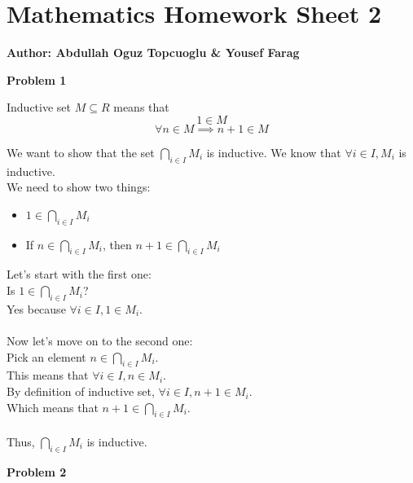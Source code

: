 \documentclass{article}
\begin{document}
\section*{\huge Mathematics Homework Sheet 2}
\begin{flushright}
   \textbf{Author: Abdullah Oguz Topcuoglu \& Yousef Farag}
\end{flushright}

\begin{flushleft}
   \textbf{\Large Problem 1}
\end{flushleft}

Inductive set \(M \subseteq R\) means that
\[
   1 \in M
\]
\[
   \forall n \in M \implies n+1 \in M
\]

We want to show that the set \( \bigcap_{i \in I} M_i \) is inductive.
We know that \(\forall i \in I, M_i\) is inductive. \\
We need to show two things: \\
\begin{itemize}
   \item \(1 \in \bigcap_{i \in I} M_i\)
   \item If \(n \in \bigcap_{i \in I} M_i\), then \(n+1 \in \bigcap_{i \in I} M_i\)
\end{itemize}

Let's start with the first one: \\
Is \(1 \in \bigcap_{i \in I} M_i\)? \\
Yes because \(\forall i \in I, 1 \in M_i\). \\
\\
Now let's move on to the second one: \\
Pick an element \(n \in \bigcap_{i \in I} M_i\). \\
This means that \(\forall i \in I, n \in M_i\). \\
By definition of inductive set, \(\forall i \in I, n+1 \in M_i\). \\
Which means that \(n+1 \in \bigcap_{i \in I} M_i\). \\
\\
Thus, \(\bigcap_{i \in I} M_i\) is inductive.

\begin{flushleft}
   \textbf{\Large Problem 2}
\end{flushleft}
\end{document}
